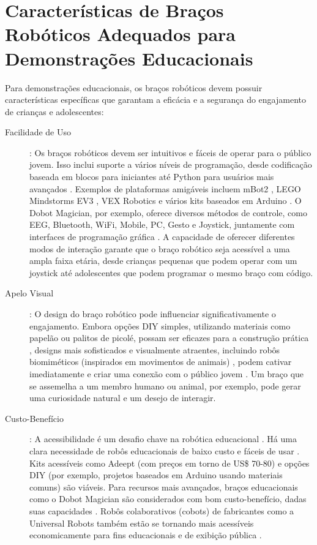 \documentclass[%
  12pt,%
  a4paper,%
  oneside,%
  openright,%
  sumario = abnt-6027-2012,%
  chapter = TITLE,%
  pretextualoneside,%
  fontetimes,%
  semrecuonosumario,%
  usemakeindex,%
  pardeassinaturas,%
  english,%
  french,%
  spanish,%
  brazil,%
]{utfpr}%
\begin{document}
\section{Características de Braços Robóticos Adequados para Demonstrações Educacionais}
Para demonstrações educacionais, os braços robóticos devem possuir características específicas que garantam a eficácia e a segurança do engajamento de crianças e adolescentes:
	\begin{description}
		\item [Facilidade de Uso]: Os braços robóticos devem ser intuitivos e fáceis de operar para o público jovem. Isso inclui suporte a vários níveis de programação, desde codificação baseada em blocos para iniciantes até Python para usuários mais avançados \cite{makeblockMBot22025}. Exemplos de plataformas amigáveis incluem mBot2 \cite{makeblockMBot22025}, LEGO Mindstorms EV3 \cite{centrePointRoboticsGames2025}, VEX Robotics \cite{meegleYouthRobotics2025} e vários kits baseados em Arduino \cite{cheung2024SummerLibraries}. O Dobot Magician, por exemplo, oferece diversos métodos de controle, como EEG, Bluetooth, WiFi, Mobile, PC, Gesto e Joystick, juntamente com interfaces de programação gráfica \cite{robotlabDobotClassroomPack2025}. A capacidade de oferecer diferentes modos de interação garante que o braço robótico seja acessível a uma ampla faixa etária, desde crianças pequenas que podem operar com um joystick até adolescentes que podem programar o mesmo braço com código.
		\item [Apelo Visual]: O design do braço robótico pode influenciar significativamente o engajamento. Embora opções DIY simples, utilizando materiais como papelão ou palitos de picolé, possam ser eficazes para a construção prática \cite{scienceBuddiesBuildRoboticArm2025}, designs mais sofisticados e visualmente atraentes, incluindo robôs biomiméticos (inspirados em movimentos de animais) \cite{ross2024BeyondExhibits}, podem cativar imediatamente e criar uma conexão com o público jovem \cite{chang2025ConstructedResponse}. Um braço que se assemelha a um membro humano ou animal, por exemplo, pode gerar uma curiosidade natural e um desejo de interagir.
		\item [Custo-Benefício]: A acessibilidade é um desafio chave na robótica educacional \cite{ross2024BeyondExhibits}. Há uma clara necessidade de robôs educacionais de baixo custo e fáceis de usar \cite{ross2024BeyondExhibits}. Kits acessíveis como Adeept (com preços em torno de US\$ 70-80) \cite{robotshopArmsGrippers2025} e opções DIY (por exemplo, projetos baseados em Arduino usando materiais comuns) \cite{scienceBuddiesBuildRoboticArm2025} são viáveis. Para recursos mais avançados, braços educacionais como o Dobot Magician são considerados com bom custo-benefício, dadas suas capacidades \cite{robotlabDobotClassroomPack2025}. Robôs colaborativos (cobots) de fabricantes como a Universal Robots também estão se tornando mais acessíveis economicamente para fins educacionais e de exibição pública \cite{top3dshopDobotMagicianReview2023}.

\end{description}
\end{document}
